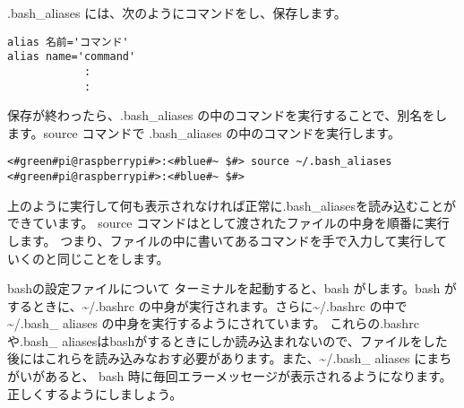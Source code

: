 .bash{\_}aliases には、次のようにコマンドをし、保存します。
\begin{lstlisting}[caption=\textasciitilde/.bash\_aliasesの書き方1, label=bashAliasesGrammar1]
alias 名前='コマンド'
alias name='command'
            :
            :
\end{lstlisting}

保存が終わったら、.bash{\_}aliases の中のコマンドを実行することで、別名をします。source コマンドで .bash{\_}aliases の中のコマンドを実行します。
\begin{lstlisting}[caption=\textasciitilde/.bash\_aliasesの読込, label=sourceBashAliases]
<#green#pi@raspberrypi#>:<#blue#~ $#> source ~/.bash_aliases
<#green#pi@raspberrypi#>:<#blue#~ $#>
\end{lstlisting}
上のように実行して何も表示されなければ正常に.bash\_aliasesを読み込むことができています。
source コマンドはとして渡されたファイルの中身を順番に実行します。
つまり、ファイルの中に書いてあるコマンドを手で入力して実行していくのと同じことをします。

\begin{itembox}[c]{bashの設定ファイルについて}
    ターミナルを起動すると、bash がします。bash がするときに、\textasciitilde/.bashrc の中身が実行されます。さらに\textasciitilde/.bashrc の中で \textasciitilde/.bash\_ aliases の中身を実行するようにされています。
    これらの.bashrcや.bash\_ aliasesはbashがするときにしか読み込まれないので、ファイルをした後にはこれらを読み込みなおす必要があります。また、\textasciitilde/.bash\_ aliases にまちがいがあると、
    bash 時に毎回エラーメッセージが表示されるようになります。正しくするようにしましょう。
\end{itembox}

\begin{tcolorbox}[title=\useOmetoi]
    \begin{enumerate}
    \end{enumerate}
\end{tcolorbox}

